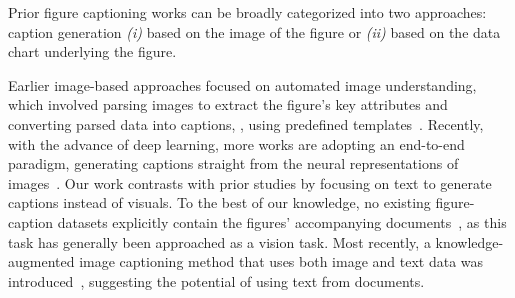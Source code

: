  




Prior figure captioning works can be broadly categorized into two approaches:
caption generation {\em (i)} based on the image of the figure or {\em (ii)} based on the data chart underlying the figure.

Earlier image-based approaches focused on automated image understanding, which involved parsing images to extract the figure's key attributes and converting parsed data into captions, \eg, using predefined templates~\cite{kahou2017figureqa,kafle2018dvqa,Methani_2020_WACV,qian2021generating,siegel2016figureseer}.
Recently, with the advance of deep learning, more works are adopting an end-to-end paradigm, generating captions straight from the neural representations of images~\cite{9973197,ImageCLEFmedConceptOverview2021,hsu-etal-2021-scicap-generating,10.1145/3341162.3345601,kanthara2022chart,chen2019figure}.
Our work contrasts with prior studies by focusing on text to generate captions instead of visuals. 
To the best of our knowledge, no existing figure-caption datasets explicitly contain the figures' accompanying documents~\cite{ImageCLEFmedConceptOverview2021,hsu-etal-2021-scicap-generating,10.1145/3341162.3345601}, as this task has generally been approached as a vision task.
Most recently, a knowledge-augmented image captioning method that uses both image and text data was introduced~\cite{scicap-plus}, suggesting the potential of using text from documents.

